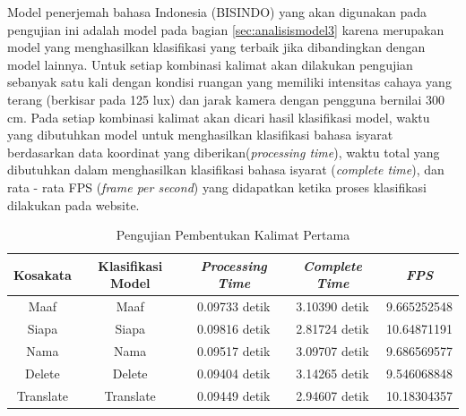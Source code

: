 Model penerjemah bahasa Indonesia (BISINDO) yang akan digunakan pada pengujian ini adalah model pada bagian \ref{sec:analisismodel3} karena merupakan model yang menghasilkan klasifikasi yang terbaik jika dibandingkan dengan model lainnya. Untuk setiap kombinasi kalimat akan dilakukan pengujian sebanyak satu kali dengan kondisi ruangan yang memiliki intensitas cahaya yang terang (berkisar pada 125 lux) dan jarak kamera dengan pengguna bernilai 300 cm. Pada setiap kombinasi kalimat akan dicari hasil klasifikasi model, waktu yang dibutuhkan model untuk menghasilkan klasifikasi bahasa isyarat berdasarkan data koordinat yang diberikan(\emph{processing time}), waktu total yang dibutuhkan dalam menghasilkan klasifikasi bahasa isyarat (\emph{complete time}), dan rata - rata FPS (\emph{frame per second}) yang didapatkan ketika proses klasifikasi dilakukan pada website.  

\begin{longtable}{|c|c|c|c|c|}
  \caption{Pengujian Pembentukan Kalimat Pertama}
  \label{tb:prediksikombinasi1}                                   \\
  \hline
  \rowcolor[HTML]{C0C0C0}
  \textbf{Kosakata} & \textbf{Klasifikasi Model} & \textbf{\emph{Processing Time}} & \textbf{\emph{Complete Time}} & \textbf{\emph{FPS}}\\
  \hline
  Maaf                & Maaf                          & 0.09733 detik                           & 3.10390 detik                                  & 9.665252548\\
  Siapa               & Siapa                         & 0.09816 detik                           & 2.81724 detik                                  & 10.64871191\\
  Nama                & Nama                          & 0.09517 detik                           & 3.09707 detik                                  & 9.686569577\\
  Delete              & Delete                        & 0.09404 detik                           & 3.14265 detik                                  & 9.546068848\\
  Translate           & Translate                     & 0.09449 detik                           & 2.94607 detik                                  & 10.18304357\\
  \hline
\end{longtable}



